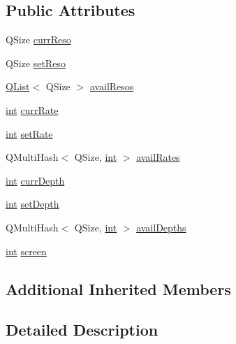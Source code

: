 \subsection*{Public Attributes}
\begin{DoxyCompactItemize}
\item 
Q\-Size \hyperlink{class_qxt_screen_private_aa02abef2ca59565f140c97c1b9c42eb0}{curr\-Reso}
\item 
Q\-Size \hyperlink{class_qxt_screen_private_a5f0b0f442c884ee16b500a6d398b9136}{set\-Reso}
\item 
\hyperlink{class_q_list}{Q\-List}$<$ Q\-Size $>$ \hyperlink{class_qxt_screen_private_a18ea3283b1bfdfcf2aae9c9284150fe9}{avail\-Resos}
\item 
\hyperlink{ioapi_8h_a787fa3cf048117ba7123753c1e74fcd6}{int} \hyperlink{class_qxt_screen_private_ad21175ec23ce7082baba2070bbf4ba43}{curr\-Rate}
\item 
\hyperlink{ioapi_8h_a787fa3cf048117ba7123753c1e74fcd6}{int} \hyperlink{class_qxt_screen_private_ae809a89ab77be917f65ba9426f4a5555}{set\-Rate}
\item 
Q\-Multi\-Hash$<$ Q\-Size, \hyperlink{ioapi_8h_a787fa3cf048117ba7123753c1e74fcd6}{int} $>$ \hyperlink{class_qxt_screen_private_aad130c518bab6c03781e29bfb7548548}{avail\-Rates}
\item 
\hyperlink{ioapi_8h_a787fa3cf048117ba7123753c1e74fcd6}{int} \hyperlink{class_qxt_screen_private_a8315be33c253dfb1fdc59c6b0b5b018a}{curr\-Depth}
\item 
\hyperlink{ioapi_8h_a787fa3cf048117ba7123753c1e74fcd6}{int} \hyperlink{class_qxt_screen_private_afd1f011ce0f1097b9f3853c4525f0212}{set\-Depth}
\item 
Q\-Multi\-Hash$<$ Q\-Size, \hyperlink{ioapi_8h_a787fa3cf048117ba7123753c1e74fcd6}{int} $>$ \hyperlink{class_qxt_screen_private_aa9705e1195c8ea5386ea2a169fff74d5}{avail\-Depths}
\item 
\hyperlink{ioapi_8h_a787fa3cf048117ba7123753c1e74fcd6}{int} \hyperlink{class_qxt_screen_private_ae03501b1a6e55c314aac168f1377bf2a}{screen}
\end{DoxyCompactItemize}
\subsection*{Additional Inherited Members}


\subsection{Detailed Description}


